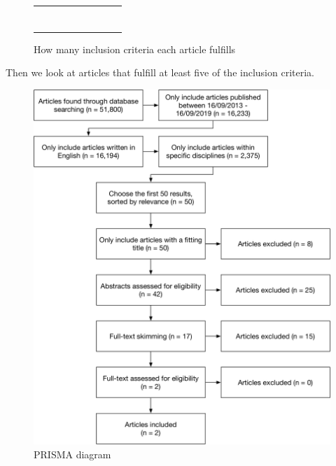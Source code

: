 \documentclass[a4paper,12pt]{article}
\newcommand{\xmark}{\color{red}\ding{53}}%
\newcommand{\cmark}{\color{green}\ding{51}}%
\begin{document}
\begin{figure}[H]
\begin{table}[H]
\begin{tabularx}{\textwidth}{| @{} c | c | c | c | c | c | c | c | c |}
    \cite{BD17}  & \xmark & \xmark & \xmark & \xmark & \xmark & \xmark & \xmark  \\        \cline{1-8}
    \cite{BD21}        & \xmark & \cmark & \cmark &\xmark  &\cmark   & \xmark &\xmark  \\        \cline{1-8}
    \cite{BD22}     & \cmark & \xmark &  \xmark & \xmark & \cmark & \xmark & \xmark \\        \cline{1-8}
    \cite{BD24}&\xmark &  &  & \xmark &  &  \xmark&  \xmark\\        \cline{1-8}
    \cite{BD28}        & &  &  &  &  &  &  \\        \cline{1-8}
    \cite{BD33}        & &  &  &  &  &  &  \\        \cline{1-8}
    \cite{BD34}& &  &  &  &  &  &  \\        \cline{1-8}
    \end{tabularx}
    \end{table}

    \caption{How many inclusion criteria each article fulfills}
    \label{bad}
\end{figure}

Then we look at articles that fulfill at least five of the inclusion criteria.

\begin{figure}[H]
    \begin{center}
    \includegraphics[scale=0.5]{PRISMA.pdf}
    \end{center}
    \caption{PRISMA diagram}
    \label{prisma}
\end{figure}
\end{document}
